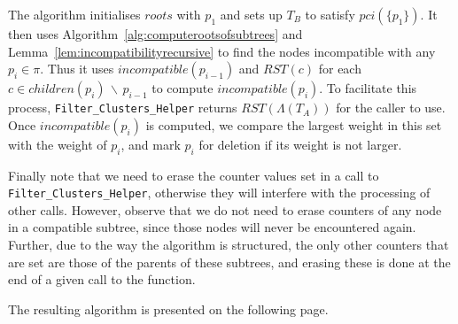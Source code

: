 \documentclass{article}
\newcommand{\leafset}{\Lambda}
\begin{document}
    The algorithm initialises $roots$ with $p_1$ and sets up $T_B$ to satisfy $pci(\{p_1\})$. It then uses Algorithm~\ref{alg:computerootsofsubtrees} and Lemma~\ref{lem:incompatibilityrecursive} to find the nodes incompatible with any $p_i \in \pi$. Thus it uses $incompatible(p_{i-1})$ and $RST(c)$ for each $c \in children(p_i)\, \backslash\, p_{i-1}$ to compute $incompatible(p_i)$. To facilitate this process, \texttt{Filter\_Clusters\_Helper} returns $RST(\leafset(T_A))$ for the caller to use. Once $incompatible(p_i)$ is computed, we compare the largest weight in this set with the weight of $p_i$, and mark $p_i$ for deletion if its weight is not larger.

    Finally note that we need to erase the counter values set in a call to \texttt{Filter\_Clusters\_Helper}, otherwise they will interfere with the processing of other calls. However, observe that we do not need to erase counters of any node in a compatible subtree, since those nodes will never be encountered again. Further, due to the way the algorithm is structured, the only other counters that are set are those of the parents of these subtrees, and erasing these is done at the end of a given call to the function.

    The resulting algorithm is presented on the following page.
\end{document}
